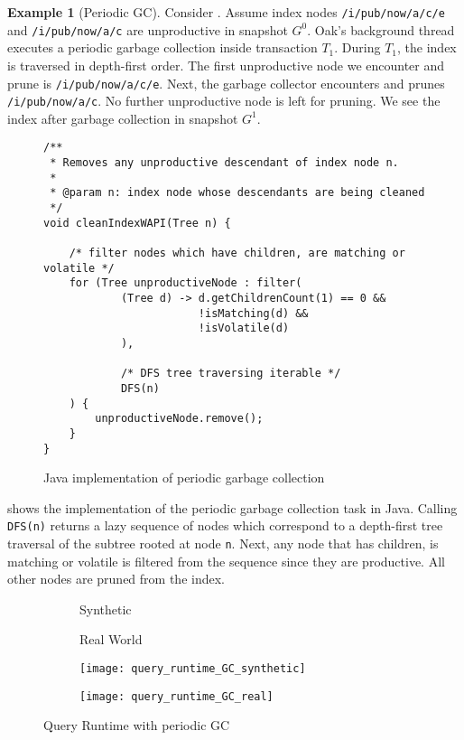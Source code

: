 \message{ !name(thesis.tex)}\documentclass[abstracton,12pt]{scrartcl}
\theoremstyle{definition}
\newtheorem{example}{Example}
\begin{document}
\begin{example}[Periodic GC]
  Consider . Assume index nodes \texttt{/i/pub/now/a/c/e}
  and \texttt{/i/pub/now/a/c} are unproductive in snapshot $G^0$. Oak's
  background thread executes a periodic garbage collection inside transaction
  $T_1$. During $T_1$, the index is traversed in depth-first order.
  The first unproductive node we encounter and prune is
  \texttt{/i/pub/now/a/c/e}. Next, the garbage collector encounters and prunes
  \texttt{/i/pub/now/a/c}. No further unproductive node is left for pruning. We
  see the index after garbage collection in snapshot $G^1$.
\end{example}

\begin{figure}[H]
  \small
  \begin{framed}
\begin{verbatim}
/**
 * Removes any unproductive descendant of index node n.
 *
 * @param n: index node whose descendants are being cleaned
 */
void cleanIndexWAPI(Tree n) {

    /* filter nodes which have children, are matching or volatile */
    for (Tree unproductiveNode : filter(
            (Tree d) -> d.getChildrenCount(1) == 0 &&
                        !isMatching(d) &&
                        !isVolatile(d)
            ),

            /* DFS tree traversing iterable */
            DFS(n)
    ) {
        unproductiveNode.remove();
    }
}
\end{verbatim}
  \end{framed}
  \caption{Java implementation of periodic garbage collection}
  \label{fig:java_periodic_gc}
\end{figure}

 shows the implementation of the periodic
garbage collection task in Java. Calling \texttt{DFS(n)} returns a lazy sequence of nodes
which correspond to a depth-first tree traversal of the subtree rooted at node
\texttt{n}. Next, any node that has children, is matching or volatile is
filtered from the sequence since they are productive. All other nodes are pruned
from the index.

\begin{figure}[H]
  \centering
  \begin{subfigure}{0.49\linewidth}
    \centering Synthetic
  \end{subfigure}
  \begin{subfigure}{0.49\linewidth}
    \centering Real World
  \end{subfigure}
  \begin{subfigure}{0.49\linewidth}
    \texttt{[image: query\_runtime\_GC\_synthetic]}
    \caption{}
    \label{fig:query_runtime_GC_synthetic}
  \end{subfigure}
  \begin{subfigure}{0.49\linewidth}
    \texttt{[image: query\_runtime\_GC\_real]}
    \caption{}
    \label{fig:query_runtime_GC_real}
  \end{subfigure}
  \caption{Query Runtime with periodic GC}
\end{figure}
\end{document}
